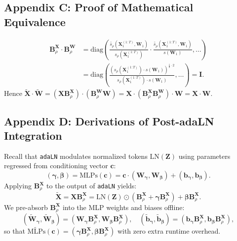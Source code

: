 \documentclass[10pt,a4paper]{article}
\begin{document}
\subsection*{Appendix C: Proof of Mathematical Equivalence}
\begin{align}
\mathbf{B}_\rho^{\mathbf{X}} \cdot \mathbf{B}_\rho^{\mathbf{W}}
&= \mathrm{diag}\!\left(\frac{\widetilde{s_\rho}(\mathbf{X}_1^{(1:T)}, \mathbf{W}_1)}{s_\rho(\mathbf{X}_1^{(1:T)})} \cdot \frac{\widetilde{s_\rho}(\mathbf{X}_1^{(1:T)}, \mathbf{W}_1)}{s(\mathbf{W}_1)}, \ldots\right) \nonumber \\
&= \mathrm{diag}\!\left(\frac{(s_\rho(\mathbf{X}_1^{(1:T)}) \cdot s(\mathbf{W}_1))^{\frac{1}{2}\cdot 2}}{s_\rho(\mathbf{X}_1^{(1:T)}) \cdot s(\mathbf{W}_1)}, \ldots\right) = \mathbf{I}. \label{eq:15}
\end{align}
Hence $\widetilde{\mathbf{X}} \cdot \widetilde{\mathbf{W}} = (\mathbf{X}\mathbf{B}_\rho^{\mathbf{X}}) \cdot (\mathbf{B}_\rho^{\mathbf{W}}\mathbf{W}) = \mathbf{X} \cdot (\mathbf{B}_\rho^{\mathbf{X}}\mathbf{B}_\rho^{\mathbf{W}}) \cdot \mathbf{W} = \mathbf{X} \cdot \mathbf{W}$.

\subsection*{Appendix D: Derivations of Post-adaLN Integration}
Recall that \texttt{adaLN} modulates normalized tokens $\mathrm{LN}(\mathbf{Z})$ using parameters regressed from conditioning vector $\mathbf{c}$:
\begin{equation}
(\boldsymbol{\gamma}, \boldsymbol{\beta}) = \mathrm{MLPs}(\mathbf{c}) = \mathbf{c} \cdot (\mathbf{W}_{\boldsymbol{\gamma}}, \mathbf{W}_{\boldsymbol{\beta}}) + (\mathbf{b}_{\boldsymbol{\gamma}}, \mathbf{b}_{\boldsymbol{\beta}}).
\label{eq:18}
\end{equation}
Applying $\mathbf{B}_\rho^{\mathbf{X}}$ to the output of \texttt{adaLN} yields:
\begin{equation}
\widetilde{\mathbf{X}} = \mathbf{X}\mathbf{B}_\rho^{\mathbf{X}} = \mathrm{LN}(\mathbf{Z}) \odot \left(\mathbf{B}_\rho^{\mathbf{X}} + \boldsymbol{\gamma}\mathbf{B}_\rho^{\mathbf{X}}\right) + \boldsymbol{\beta}\mathbf{B}_\rho^{\mathbf{X}}.
\label{eq:19}
\end{equation}
We pre-absorb $\mathbf{B}_\rho^{\mathbf{X}}$ into the MLP weights and biases offline:
\begin{equation}
(\widetilde{\mathbf{W}}_{\boldsymbol{\gamma}}, \widetilde{\mathbf{W}}_{\boldsymbol{\beta}}) = (\mathbf{W}_{\boldsymbol{\gamma}}\mathbf{B}_\rho^{\mathbf{X}}, \mathbf{W}_{\boldsymbol{\beta}}\mathbf{B}_\rho^{\mathbf{X}}), \quad (\widetilde{\mathbf{b}}_{\boldsymbol{\gamma}}, \widetilde{\mathbf{b}}_{\boldsymbol{\beta}}) = (\mathbf{b}_{\boldsymbol{\gamma}}\mathbf{B}_\rho^{\mathbf{X}}, \mathbf{b}_{\boldsymbol{\beta}}\mathbf{B}_\rho^{\mathbf{X}}),
\label{eq:20}
\end{equation}
so that $\widetilde{\mathrm{MLPs}}(\mathbf{c}) = (\boldsymbol{\gamma}\mathbf{B}_\rho^{\mathbf{X}}, \boldsymbol{\beta}\mathbf{B}_\rho^{\mathbf{X}})$ with zero extra runtime overhead.
\end{document}
